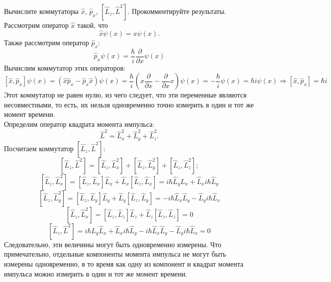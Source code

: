 \documentclass[__main__.tex]{subfiles}
\begin{document}
Вычислите коммутаторы $\hat{x}$, $\hat{p}_x$, $\left[\hat{L}_z,\hat{L}^2\right]$. Прокомментируйте результаты.\\ 

Рассмотрим оператор $\hat{x}$ такой, что 
$$
\hat{x}\psi(x)=x\psi(x).
$$
Также рассмотрим оператор $\hat{p}_x$:
$$
\hat{p}_x\psi(x)=\frac{\hbar}{i}\dfrac{\partial}{\partial x}\psi (x)
$$
Вычислим коммутатор этих операторов:
$$
[\hat{x}, \hat{p}_x]\psi(x)=(\hat{x}\hat{p}_x-\hat{p}_x\hat{x})\psi(x)=\frac{\hbar}{i}(x\frac{\partial}{\partial x}-\frac{\partial}{\partial x}x)\psi(x)=-\frac{\hbar}{i}\psi(x)=\hbar i \psi(x) \Longrightarrow [\hat{x}, \hat{p}_x]=\hbar i
$$
Этот коммутатор не равен нулю, из чего следует, что эти переменные являются несовместными, то есть, их нельзя одновременно точно измерить в один и тот же момент времени.\\

Определим оператор квадрата момента импульса:
$$
\hat{L}^2=\hat{L}_x^2+\hat{L}_y^2+\hat{L}_z^2.
$$
Посчитаем коммутатор $\left[\hat{L}_z,\hat{L}^2\right]$:
$$
\left[\hat{L}_z,\hat{L}^2\right] = \left[\hat{L}_z,\hat{L}^2_x\right] + \left[\hat{L}_z,\hat{L}^2_y\right]+\left[\hat{L}_z,\hat{L}^2_z\right];
$$
$$
\left[\hat{L}_z,\hat{L}^2_x\right]= \left[\hat{L}_z,\hat{L}_x\right]\hat{L}_x+\hat{L}_x\left[\hat{L}_z,\hat{L}_x\right]=i\hbar\hat{L}_y\hat{L}_x+\hat{L}_xi\hbar\hat{L}_y
$$
$$
\left[\hat{L}_z,\hat{L}^2_y\right]= \left[\hat{L}_z,\hat{L}_y\right]\hat{L}_y+\hat{L}_y\left[\hat{L}_z,\hat{L}_y\right]=-i\hbar\hat{L}_x\hat{L}_y-\hat{L}_yi\hbar\hat{L}_x
$$
$$
\left[\hat{L}_z,\hat{L}^2_x\right]= \left[\hat{L}_z,\hat{L}_z\right]\hat{L}_z+\hat{L}_z\left[\hat{L}_z,\hat{L}_z\right]=0
$$
$$
\left[\hat{L}_z,\hat{L}^2\right] = i\hbar\hat{L}_y\hat{L}_x+\hat{L}_xi\hbar\hat{L}_y-i\hbar\hat{L}_x\hat{L}_y-\hat{L}_yi\hbar\hat{L}_x = 0
$$
Следовательно, эти величины могут быть одновременно измерены. Что примечательно, отдельные компоненты момента импульса не могут быть измерены одновременно, в то время как одну из компонент и квадрат момента импульса можно измерить в один и тот же момент времени.
\end{document}
